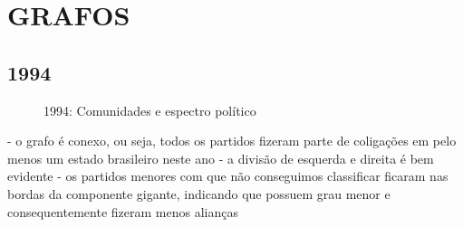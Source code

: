\section{\texorpdfstring{\MakeUppercase{Grafos}}{}}
\label{resultados__grafos}


\subsection{1994}
\label{resultados__grafos--1994}

\begin{figure}[H]
\center
    \qquad

    \caption{1994: Comunidades e espectro político}
\end{figure}

- o grafo é conexo, ou seja, todos os partidos fizeram parte de coligações em pelo menos um estado brasileiro neste ano
- a divisão de esquerda e direita é bem evidente
- os partidos menores com que não conseguimos classificar ficaram nas bordas da componente gigante, indicando que possuem grau menor e consequentemente fizeram menos alianças


